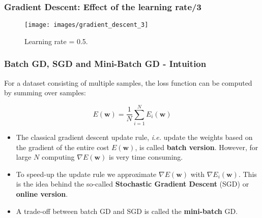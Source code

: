 \documentclass{beamer}
\begin{document}
	\begin{frame}
		\frametitle{Gradient Descent: Effect of the learning rate/3}
		\begin{figure}
			\centering
			\texttt{[image: images/gradient\_descent\_3]}
			\caption{Learning rate = 0.5.}
		\end{figure}
	\end{frame}

	\begin{frame}
		\frametitle{Batch GD, SGD and Mini-Batch GD - Intuition}
		
		For a dataset consisting of multiple samples, the loss function can be computed by summing over samples:
		
		$$E(\bm{w}) = \frac{1}{N} \sum_{i=1}^N E_i(\bm{w})$$
		
		\begin{itemize}
			\item The classical gradient descent update rule, \textit{i.e.} update the weights based on the gradient of the entire cost $E(\bm{w})$, is called \textbf{batch version}. However, for large $N$ computing $\nabla E(\bm{w})$ is very time consuming.
			
			\item To speed-up the update rule we approximate $\nabla E(\bm{w})$ with $\nabla E_i(\bm{w})$. This is the idea behind the so-called \textbf{Stochastic Gradient Descent} (SGD) or \textbf{online version}.
			
			\item A trade-off between batch GD and SGD is called the \textbf{mini-batch} GD.
		\end{itemize}
		
	\end{frame}
\end{document}
